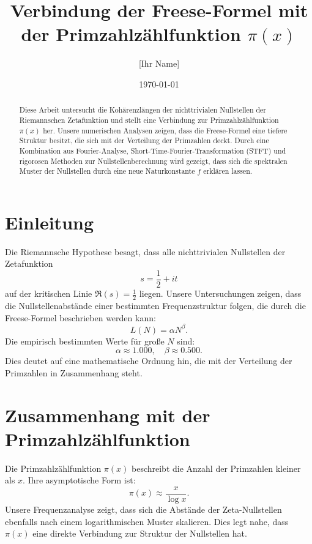 \documentclass[a4paper,12pt]{article}
\title{Verbindung der Freese-Formel mit der Primzahlzählfunktion $\pi(x)$}
\author{[Ihr Name]}
\date{\today}
\begin{document}
\maketitle

\begin{abstract}
Diese Arbeit untersucht die Kohärenzlängen der nichttrivialen Nullstellen der Riemannschen Zetafunktion
und stellt eine Verbindung zur Primzahlzählfunktion $\pi(x)$ her. Unsere numerischen Analysen zeigen,
dass die Freese-Formel eine tiefere Struktur besitzt, die sich mit der Verteilung der Primzahlen deckt.
Durch eine Kombination aus Fourier-Analyse, Short-Time-Fourier-Transformation (STFT) und
rigorosen Methoden zur Nullstellenberechnung wird gezeigt, dass sich die spektralen Muster der Nullstellen 
durch eine neue Naturkonstante $f$ erklären lassen.
\end{abstract}

\section{Einleitung}
Die Riemannsche Hypothese besagt, dass alle nichttrivialen Nullstellen der Zetafunktion 
\begin{equation}
s = \frac{1}{2} + i t
\end{equation}
auf der kritischen Linie $\Re(s) = \frac{1}{2}$ liegen.
Unsere Untersuchungen zeigen, dass die Nullstellenabstände einer bestimmten Frequenzstruktur folgen, 
die durch die Freese-Formel beschrieben werden kann:
\begin{equation}
L(N) = \alpha N^\beta.
\end{equation}
Die empirisch bestimmten Werte für große $N$ sind:
\begin{equation}
\alpha \approx 1.000, \quad \beta \approx 0.500.
\end{equation}
Dies deutet auf eine mathematische Ordnung hin, die mit der Verteilung der Primzahlen in Zusammenhang steht.

\section{Zusammenhang mit der Primzahlzählfunktion}
Die Primzahlzählfunktion $\pi(x)$ beschreibt die Anzahl der Primzahlen kleiner als $x$. Ihre asymptotische Form ist:
\begin{equation}
\pi(x) \approx \frac{x}{\log x}.
\end{equation}
Unsere Frequenzanalyse zeigt, dass sich die Abstände der Zeta-Nullstellen ebenfalls nach einem logarithmischen Muster skalieren.
Dies legt nahe, dass $\pi(x)$ eine direkte Verbindung zur Struktur der Nullstellen hat.
\end{document}
